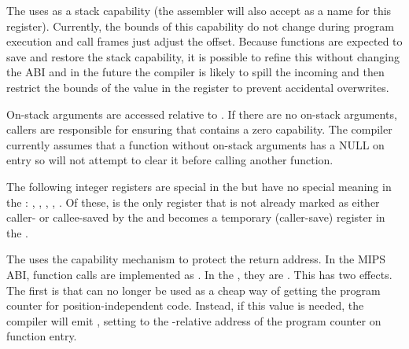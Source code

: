 The \purecapABI{} uses  as a stack capability (the assembler will also accept  as a name for this register).
Currently, the bounds of this capability do not change during program execution and call frames just adjust the offset.
Because functions are expected to save and restore the stack capability, it is possible to refine this without changing the ABI and in the future the compiler is likely to spill the incoming  and then restrict the bounds of the value in the register to prevent accidental overwrites.

On-stack arguments are accessed relative to .
If there are no on-stack arguments, callers are responsible for ensuring that  contains a zero capability.
The compiler currently assumes that a function without on-stack arguments has a NULL  on entry so will not attempt to clear it
before calling another function.



The following integer registers are special in the \mipsABI{} but have no special meaning in the \purecapABI{}:
, , , , .
Of these,  is the only register that is not already marked as either caller- or callee-saved by the \mipsABI{} and becomes a temporary (caller-save) register in the \purecapABI{}.

The \purecapABI{} uses the capability mechanism to protect the return address.
In the MIPS ABI, function calls are implemented as .
In the \purecapABI{}, they are .
This has two effects.
The first is that  can no longer be used as a cheap way of getting the program counter for position-independent code.
Instead, if this value is needed, the compiler will emit , setting  to the -relative address of the program counter on function entry.

